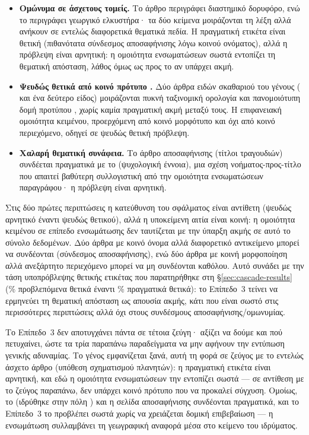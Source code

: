 \begin{itemize}
  \item \textbf{Ομώνυμα σε άσχετους τομείς.} Το άρθρο  περιγράφει
  διαστημικό δορυφόρο, ενώ το  περιγράφει γεωργικό ελκυστήρα· τα δύο
  κείμενα μοιράζονται τη λέξη  αλλά ανήκουν σε εντελώς διαφορετικά
  θεματικά πεδία.
  Η πραγματική ετικέτα είναι θετική (πιθανότατα σύνδεσμος
  αποσαφήνισης λόγω κοινού ονόματος), αλλά η πρόβλεψη είναι αρνητική: η ομοιότητα
  ενσωματώσεων σωστά εντοπίζει τη θεματική απόσταση, λάθος όμως ως προς το αν
  υπάρχει ακμή.
  \item \textbf{Ψευδώς θετικά από κοινό πρότυπο .} Δύο άρθρα ειδών
  σκαθαριού του γένους  ( και ένα δεύτερο
  είδος) μοιράζονται πυκνή ταξινομική ορολογία και πανομοιότυπη δομή προτύπου
  , χωρίς καμία πραγματική ακμή μεταξύ τους.
  Η επιφανειακή ομοιότητα
  κειμένου, προερχόμενη από κοινό μορφότυπο και όχι από κοινό περιεχόμενο, οδηγεί σε
  ψευδώς θετική πρόβλεψη.
  \item \textbf{Χαλαρή θεματική συνάφεια.} Το άρθρο αποσαφήνισης 
  (τίτλοι τραγουδιών) συνδέεται πραγματικά με το  (ψυχολογική
  έννοια), μια σχέση νοήματος-προς-τίτλο που απαιτεί βαθύτερη συλλογιστική από την
  ομοιότητα ενσωματώσεων παραγράφου· η πρόβλεψη είναι αρνητική.
\end{itemize}

Στις δύο πρώτες περιπτώσεις η κατεύθυνση του σφάλματος είναι αντίθετη (ψευδώς αρνητικό
έναντι ψευδώς θετικού), αλλά η υποκείμενη αιτία είναι κοινή: η ομοιότητα κειμένου σε
επίπεδο ενσωμάτωσης δεν ταυτίζεται με την ύπαρξη ακμής σε αυτό το σύνολο δεδομένων.
Δύο άρθρα με κοινό όνομα αλλά διαφορετικό αντικείμενο μπορεί να συνδέονται (σύνδεσμος
αποσαφήνισης), ενώ δύο άρθρα με κοινή μορφοποίηση  αλλά ανεξάρτητο
περιεχόμενο μπορεί να μη συνδέονται καθόλου.
Αυτό συνάδει με την τάση υποπρόβλεψης
θετικής ετικέτας που παρατηρήθηκε στη \S\ref{sec:cascade-results} (\TierThreePredPosPct\%
προβλεπόμενα θετικά έναντι \TierThreeTruePosPct\% πραγματικά θετικά): το Επίπεδο~3 τείνει να
ερμηνεύει τη θεματική απόσταση ως απουσία ακμής, κάτι που είναι σωστό στις
περισσότερες περιπτώσεις αλλά όχι στους συνδέσμους αποσαφήνισης/ομωνυμίας.

Το Επίπεδο~3 δεν αποτυγχάνει πάντα σε τέτοια ζεύγη· αξίζει να δούμε και πού
πετυχαίνει, ώστε τα τρία παραπάνω παραδείγματα να μην αφήνουν την εντύπωση
γενικής αδυναμίας.
Το γένος  εμφανίζεται ξανά, αυτή τη φορά σε
ζεύγος με το εντελώς άσχετο άρθρο  (υπόθεση σχηματισμού
πλανητών): η πραγματική ετικέτα είναι αρνητική, και εδώ η ομοιότητα
ενσωματώσεων την εντοπίζει σωστά --- σε αντίθεση με το ζεύγος 
παραπάνω, δεν υπάρχει κοινό πρότυπο  που να προκαλεί σύγχυση.
Ομοίως,
το  (ιδρύθηκε στην πόλη ) και
η σελίδα αποσαφήνισης  συνδέονται πραγματικά, και το Επίπεδο~3
το προβλέπει σωστά χωρίς να χρειάζεται δομική επιβεβαίωση --- η ενσωμάτωση
συλλαμβάνει τη γεωγραφική αναφορά μέσα στο κείμενο του ιδρύματος.

